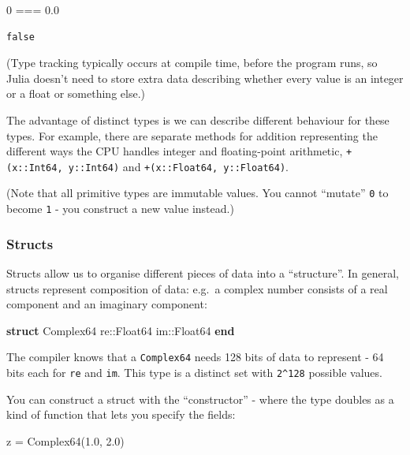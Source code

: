 \documentclass[
]{article}
\newenvironment{Shaded}{\begin{snugshade}}{\end{snugshade}}
\newcommand{\ConstantTok}[1]{\textcolor[rgb]{0.56,0.35,0.01}{#1}}
\newcommand{\DataTypeTok}[1]{\textcolor[rgb]{0.68,0.00,0.00}{#1}}
\newcommand{\FloatTok}[1]{\textcolor[rgb]{0.68,0.00,0.00}{#1}}
\newcommand{\FunctionTok}[1]{\textcolor[rgb]{0.28,0.35,0.67}{#1}}
\newcommand{\KeywordTok}[1]{\textcolor[rgb]{0.00,0.23,0.31}{\textbf{#1}}}
\newcommand{\NormalTok}[1]{\textcolor[rgb]{0.00,0.23,0.31}{#1}}
\newcommand{\OperatorTok}[1]{\textcolor[rgb]{0.37,0.37,0.37}{#1}}
\begin{document}
\begin{Shaded}
\begin{Highlighting}[]
\FloatTok{0} \OperatorTok{===} \FloatTok{0.0}
\end{Highlighting}
\end{Shaded}

\begin{verbatim}
false
\end{verbatim}

(Type tracking typically occurs at compile time, before the program
runs, so Julia doesn't need to store extra data describing whether every
value is an integer or a float or something else.)

The advantage of distinct types is we can describe different behaviour
for these types. For example, there are separate methods for addition
representing the different ways the CPU handles integer and
floating-point arithmetic, \texttt{+(x::Int64,\ y::Int64)} and
\texttt{+(x::Float64,\ y::Float64)}.

(Note that all primitive types are immutable values. You cannot
``mutate'' \texttt{0} to become \texttt{1} - you construct a new value
instead.)

\subsubsection{Structs}\label{structs}

Structs allow us to organise different pieces of data into a
``structure''. In general, structs represent composition of data: e.g.~a
complex number consists of a real component and an imaginary component:

\begin{Shaded}
\begin{Highlighting}[]
\KeywordTok{struct} \DataTypeTok{Complex64}
\NormalTok{   re}\OperatorTok{::}\DataTypeTok{Float64}
   \ConstantTok{im}\OperatorTok{::}\DataTypeTok{Float64}
\KeywordTok{end}
\end{Highlighting}
\end{Shaded}

The compiler knows that a \texttt{Complex64} needs 128 bits of data to
represent - 64 bits each for \texttt{re} and \texttt{im}. This type is a
distinct set with \texttt{2\^{}128} possible values.

You can construct a struct with the ``constructor'' - where the type
doubles as a kind of function that lets you specify the fields:

\begin{Shaded}
\begin{Highlighting}[]
\NormalTok{z }\OperatorTok{=} \FunctionTok{Complex64}\NormalTok{(}\FloatTok{1.0}\NormalTok{, }\FloatTok{2.0}\NormalTok{)}
\end{Highlighting}
\end{Shaded}
\end{document}
